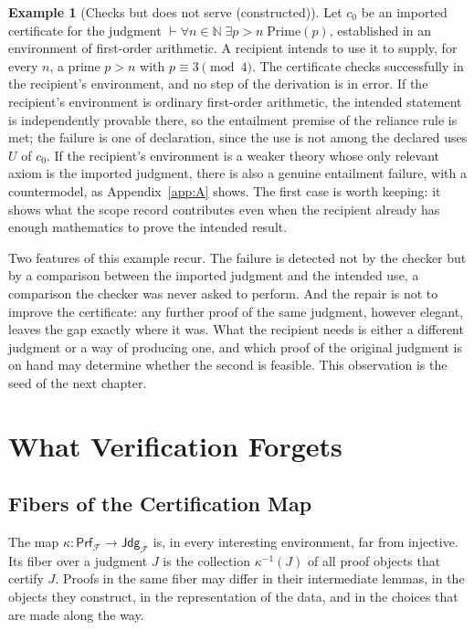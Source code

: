 \documentclass[11pt]{book}
\theoremstyle{definition}
\newtheorem{example}[theorem]{Example}
\theoremstyle{remark}
\newcommand{\Prf}{\mathsf{Prf}}
\newcommand{\Jdg}{\mathsf{Jdg}}
\newcommand{\cert}{\kappa}
\newcommand{\Fenv}{\mathcal{F}}
\begin{document}
\begin{example}[Checks but does not serve (constructed)]\label{ex:import}
Let $c_0$ be an imported certificate for the judgment $\vdash \forall n\in\mathbb{N}\;\exists p>n\;\mathrm{Prime}(p)$, established in an environment of first-order arithmetic. A recipient intends to use it to supply, for every $n$, a prime $p>n$ with $p\equiv 3 \pmod 4$. The certificate checks successfully in the recipient's environment, and no step of the derivation is in error. If the recipient's environment is ordinary first-order arithmetic, the intended statement is independently provable there, so the entailment premise of the reliance rule is met; the failure is one of declaration, since the use is not among the declared uses $U$ of $c_0$. If the recipient's environment is a weaker theory whose only relevant axiom is the imported judgment, there is also a genuine entailment failure, with a countermodel, as Appendix~\ref{app:A} shows. The first case is worth keeping: it shows what the scope record contributes even when the recipient already has enough mathematics to prove the intended result.
\end{example}

Two features of this example recur. The failure is detected not by the checker but by a comparison between the imported judgment and the intended use, a comparison the checker was never asked to perform. And the repair is not to improve the certificate: any further proof of the same judgment, however elegant, leaves the gap exactly where it was. What the recipient needs is either a different judgment or a way of producing one, and which proof of the original judgment is on hand may determine whether the second is feasible. This observation is the seed of the next chapter.

\chapter{What Verification Forgets}

\section{Fibers of the Certification Map}

The map $\cert\colon\Prf_{\Fenv}\to\Jdg_{\Fenv}$ is, in every interesting environment, far from injective. Its fiber over a judgment $J$ is the collection $\cert^{-1}(J)$ of all proof objects that certify $J$. Proofs in the same fiber may differ in their intermediate lemmas, in the objects they construct, in the representation of the data, and in the choices that are made along the way.
\end{document}
